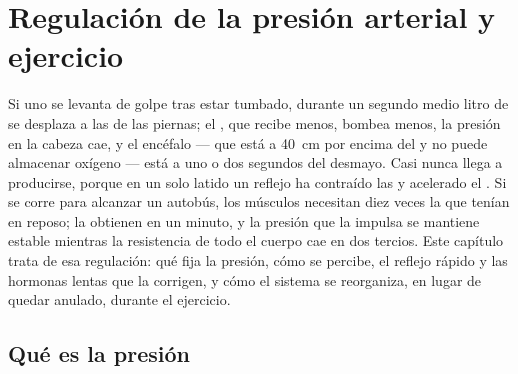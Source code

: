 \chapter{Regulación de la presión arterial y ejercicio}\label{ch:b2:blood-pressure}

Si uno se levanta de golpe tras estar tumbado, durante un segundo medio
litro de  se desplaza a las  de las piernas; el , que
recibe menos, bombea menos, la presión en la cabeza cae, y el encéfalo
--- que está a \qty{40}{cm} por encima del  y no puede almacenar
oxígeno --- está a uno o dos segundos del desmayo. Casi nunca llega a
producirse, porque en un solo latido un reflejo ha contraído las
 y acelerado el . Si se corre para alcanzar un autobús,
los músculos necesitan diez veces la  que tenían en reposo; la
obtienen en un minuto, y la presión que la impulsa se mantiene estable
mientras la resistencia de todo el cuerpo cae en dos tercios. Este
capítulo trata de esa regulación: qué fija la presión, cómo se percibe,
el reflejo rápido y las hormonas lentas que la corrigen, y cómo el sistema
se reorganiza, en lugar de quedar anulado, durante el ejercicio.

\section{Qué es la presión}

